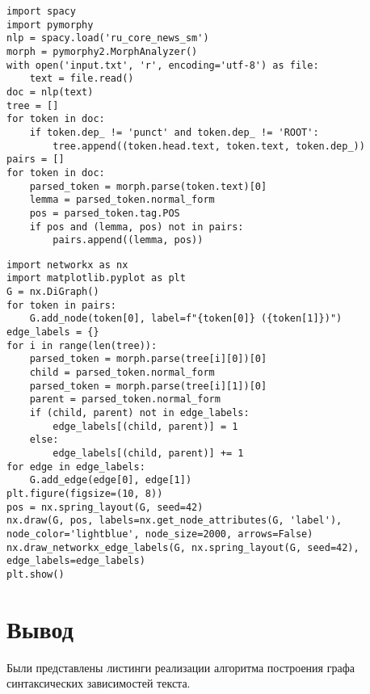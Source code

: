\begin{center}
	\captionsetup{justification=raggedright,singlelinecheck=off}
	\begin{lstlisting}[label=lst:alg1,caption=Алгоритм построения деревьев синтаксических зависимостей]
import spacy
import pymorphy
nlp = spacy.load('ru_core_news_sm')
morph = pymorphy2.MorphAnalyzer()	
with open('input.txt', 'r', encoding='utf-8') as file:
	text = file.read()
doc = nlp(text)
tree = []
for token in doc:
	if token.dep_ != 'punct' and token.dep_ != 'ROOT':
		tree.append((token.head.text, token.text, token.dep_))
pairs = []
for token in doc:
	parsed_token = morph.parse(token.text)[0]
	lemma = parsed_token.normal_form
	pos = parsed_token.tag.POS
	if pos and (lemma, pos) not in pairs:
		pairs.append((lemma, pos))
	\end{lstlisting}
\end{center}
\begin{center}
	\captionsetup{justification=raggedright,singlelinecheck=off}
	\begin{lstlisting}[label=lst:alg2,caption=Алгоритм построения графа синтаксических зависимостей и вывода его на экран]
import networkx as nx
import matplotlib.pyplot as plt
G = nx.DiGraph()	
for token in pairs:
	G.add_node(token[0], label=f"{token[0]} ({token[1]})")
edge_labels = {}
for i in range(len(tree)):
	parsed_token = morph.parse(tree[i][0])[0]
	child = parsed_token.normal_form
	parsed_token = morph.parse(tree[i][1])[0]
	parent = parsed_token.normal_form
	if (child, parent) not in edge_labels:
		edge_labels[(child, parent)] = 1
	else:
		edge_labels[(child, parent)] += 1
for edge in edge_labels:
	G.add_edge(edge[0], edge[1])
plt.figure(figsize=(10, 8))
pos = nx.spring_layout(G, seed=42)
nx.draw(G, pos, labels=nx.get_node_attributes(G, 'label'), node_color='lightblue', node_size=2000, arrows=False)
nx.draw_networkx_edge_labels(G, nx.spring_layout(G, seed=42), edge_labels=edge_labels)
plt.show()
	\end{lstlisting}
\end{center}


\section*{Вывод}

Были представлены листинги реализации алгоритма построения графа синтаксических зависимостей текста.
